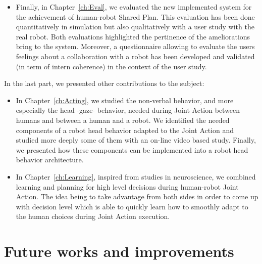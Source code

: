 \documentclass[english, a4paper,11pt,twoside]{StyleThese}
\begin{document}
\begin{itemize}
\begin{itemize}
\item Finally, in Chapter~\ref{ch:Eval}, we evaluated the new implemented system for the achievement of human-robot Shared Plan. This evaluation has been done quantitatively in simulation but also qualitatively with a user study with the real robot. Both evaluations highlighted the pertinence of the ameliorations bring to the system. Moreover, a questionnaire allowing to evaluate the users feelings about a collaboration with a robot has been developed and validated (in term of intern coherence) in the context of the user study. 
\end{itemize} 
In the last part, we presented other contributions to the subject:
\begin{itemize}
\item In Chapter~\ref{ch:Acting}, we studied the non-verbal behavior, and more especially the head -gaze- behavior, needed during Joint Action between humans and between a human and a robot. We identified the needed components of a robot head behavior adapted to the Joint Action and studied more deeply some of them with an on-line video based study. Finally, we presented how these components can be implemented into a robot head behavior architecture.
\item In Chapter~\ref{ch:Learning}, inspired from studies in neuroscience, we combined learning and planning for high level decisions during human-robot Joint Action. The idea being to take advantage from both sides in order to come up with decision level which is able to quickly learn how to smoothly adapt to the human choices during Joint Action execution.
\end{itemize}
\end{itemize}

\section*{Future works and improvements}
\end{document}
